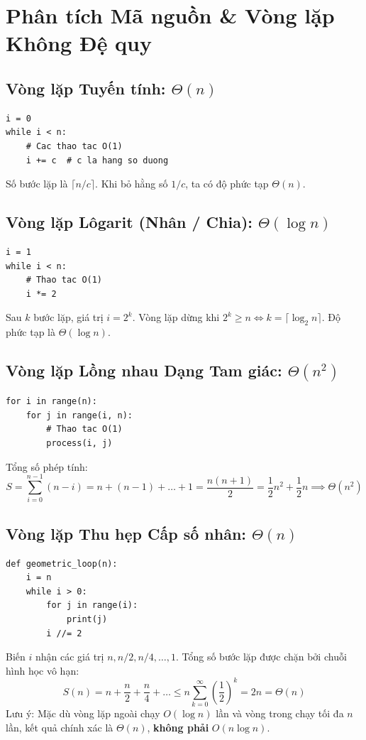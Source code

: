 \documentclass[11pt,a4paper]{article}
\begin{document}
\newpage
\section{Phân tích Mã nguồn \& Vòng lặp Không Đệ quy}

\subsection{Vòng lặp Tuyến tính: $\Theta(n)$}
\begin{lstlisting}[style=pythonstyle]
i = 0
while i < n:
    # Cac thao tac O(1)
    i += c  # c la hang so duong
\end{lstlisting}
Số bước lặp là $\lceil n/c \rceil$. Khi bỏ hằng số $1/c$, ta có độ phức tạp $\Theta(n)$.

\subsection{Vòng lặp Lôgarit (Nhân / Chia): $\Theta(\log n)$}
\begin{lstlisting}[style=pythonstyle]
i = 1
while i < n:
    # Thao tac O(1)
    i *= 2
\end{lstlisting}
Sau $k$ bước lặp, giá trị $i = 2^k$. Vòng lặp dừng khi $2^k \ge n \iff k = \lceil \log_2 n \rceil$. Độ phức tạp là $\Theta(\log n)$.

\subsection{Vòng lặp Lồng nhau Dạng Tam giác: $\Theta(n^2)$}
\begin{lstlisting}[style=pythonstyle]
for i in range(n):
    for j in range(i, n):
        # Thao tac O(1)
        process(i, j)
\end{lstlisting}
Tổng số phép tính:
\[
S = \sum_{i=0}^{n-1} (n - i) = n + (n-1) + \dots + 1 = \frac{n(n+1)}{2} = \frac{1}{2}n^2 + \frac{1}{2}n \implies \Theta(n^2)
\]

\subsection{Vòng lặp Thu hẹp Cấp số nhân: $\Theta(n)$}
\begin{lstlisting}[style=pythonstyle]
def geometric_loop(n):
    i = n
    while i > 0:
        for j in range(i):
            print(j)
        i //= 2
\end{lstlisting}
Biến $i$ nhận các giá trị $n, n/2, n/4, \dots, 1$. Tổng số bước lặp được chặn bởi chuỗi hình học vô hạn:
\[
S(n) = n + \frac{n}{2} + \frac{n}{4} + \dots \le n \sum_{k=0}^{\infty} \left(\frac{1}{2}\right)^k = 2n = \Theta(n)
\]
Lưu ý: Mặc dù vòng lặp ngoài chạy $O(\log n)$ lần và vòng trong chạy tối đa $n$ lần, kết quả chính xác là $\Theta(n)$, \textbf{không phải} $O(n \log n)$.
\end{document}
